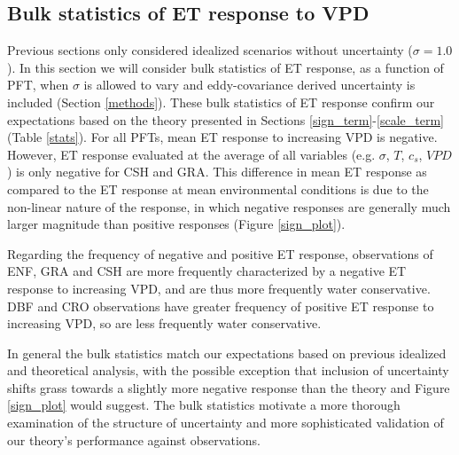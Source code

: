 \documentclass[draft,linenumbers]{agujournal}
\begin{document}
\subsection{Bulk statistics of ET response to VPD}
\label{stats_sec}
Previous sections only considered idealized scenarios without uncertainty ($\sigma = 1.0$). In this section we will consider bulk statistics of ET response, as a function of PFT, when $\sigma$ is allowed to vary and eddy-covariance derived uncertainty is included (Section \ref{methods}).  These bulk statistics of ET response confirm our expectations based on the theory presented in Sections \ref{sign_term}-\ref{scale_term} (Table \ref{stats}). For all PFTs, mean ET response to increasing VPD is negative. However, ET response evaluated at the average of all variables (e.g. $\sigma$, $T$, $c_s$, $VPD$) is only negative for CSH and GRA. This difference in mean ET response as compared to the ET response at mean environmental conditions is due to the non-linear nature of the response, in which negative responses are generally much larger magnitude than positive responses (Figure \ref{sign_plot}).

Regarding the frequency of negative and positive ET response, observations of ENF, GRA and CSH are more frequently characterized by a negative ET response to increasing VPD, and are thus more frequently water conservative. DBF and CRO observations have greater frequency of positive ET response to increasing VPD, so are less frequently water conservative. 

In general the bulk statistics match our expectations based on previous idealized and theoretical analysis, with the possible exception that inclusion of uncertainty shifts grass towards a slightly more negative response than the theory and Figure \ref{sign_plot} would suggest. The bulk statistics motivate a more thorough examination of the structure of uncertainty and more sophisticated validation of our theory's performance against observations. 
\end{document}
